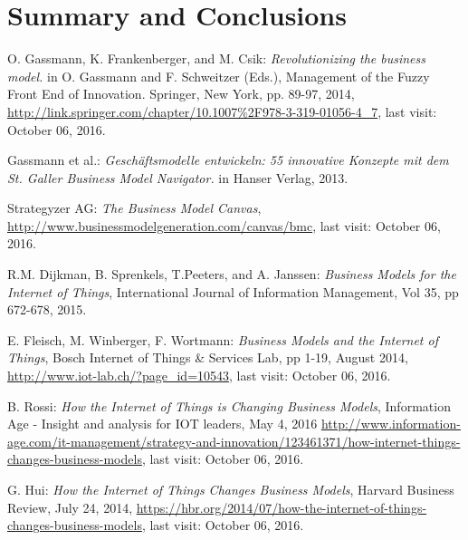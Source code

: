 \section{Summary and Conclusions}

	 \begin{thebibliography}{99}
 		  O. Gassmann, K. Frankenberger, and M. Csik: \emph{Revolutionizing the business model.} in O. Gassmann and F. Schweitzer (Eds.), Management of the Fuzzy Front End of Innovation. Springer, New York, pp. 89-97, 2014, \url{http://link.springer.com/chapter/10.1007%2F978-3-319-01056-4_7}, last visit: October 06, 2016.

 		  Gassmann et al.: \emph{Geschäftsmodelle entwickeln: 55 innovative Konzepte mit dem St. Galler Business Model Navigator.} in Hanser Verlag, 2013.

 		  Strategyzer AG: \emph{The Business Model Canvas}, \url{http://www.businessmodelgeneration.com/canvas/bmc}, last visit: October 06, 2016.

 		  R.M. Dijkman, B. Sprenkels, T.Peeters, and A. Janssen: \emph{Business Models for the Internet of Things}, International Journal of Information Management, Vol 35, pp 672-678, 2015.

 		  E. Fleisch, M. Winberger, F. Wortmann: \emph{Business Models and the Internet of Things}, Bosch Internet of Things \& Services Lab, pp 1-19, August 2014, \url{http://www.iot-lab.ch/?page_id=10543}, last visit: October 06, 2016.

 		  B. Rossi: \emph{How the Internet of Things is Changing Business Models}, Information Age - Insight and analysis for IOT leaders, May 4, 2016 \url{http://www.information-age.com/it-management/strategy-and-innovation/123461371/how-internet-things-changes-business-models}, last visit: October 06, 2016.

 		  G. Hui: \emph{How the Internet of Things Changes Business Models}, Harvard Business Review, July 24, 2014, \url{https://hbr.org/2014/07/how-the-internet-of-things-changes-business-models}, last visit: October 06, 2016.


\end{thebibliography}
